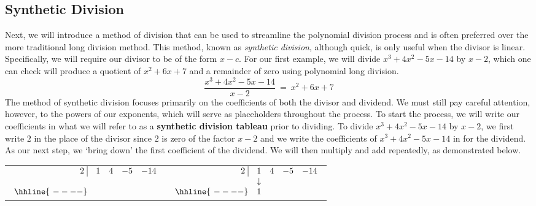 \subsection{Synthetic Division}\pp

{}\pp %

Next, we will introduce a method of division that can be used to streamline the polynomial division process and is often preferred over the more traditional long division method.  This method, known as \textit{synthetic division}, although quick, is only useful when the divisor is linear.  Specifically, we will require our divisor to be of the form $x-c$.\pp
For our first example, we will divide $x^3+4x^2-5x-14$ by $x-2$, which one can check will produce a quotient of $x^2+6x+7$ and a remainder of zero using polynomial long division.
$$\frac{x^3+4x^2-5x-14}{x-2}~=~x^2+6x+7$$
The method of synthetic division focuses primarily on the coefficients of both the divisor and dividend.  We must still pay careful attention, however, to the powers of our exponents, which will serve as placeholders throughout the process.
To start the process, we will write our coefficients in what we will refer to as a \textbf{synthetic division tableau} prior to dividing.\pp  
To divide $x^3+4x^2-5x-14$ by $x-2$, we first write $2$ in the place of the divisor since $2$ is zero of the factor $x-2$ and we write the coefficients of $x^3+4x^2-5x-14$ in for the dividend.  As our next step, we `bring down' the first coefficient of the dividend.
We will then multiply and add repeatedly, as demonstrated below.

\bigskip

\begin{center}

\begin{tabular}{cc}

$ \begin{array}{rrrrr}


  2 \, \, \vline& 1 & 4 & -5  & -14 \\
  &  &    &    &  \\ \hhline{~----} 
  &   &     &   &    \\  
\end{array}$  \hspace{1in}
&


$ \begin{array}{rrrrr}


  2 \, \, \vline& 1 & 4 & -5  & -14 \\

   & \downarrow &    &    &  \\ \hhline{~----} 
  & 1  &     &   &    \\  
\end{array}$ \\

\end{tabular}

\end{center}

